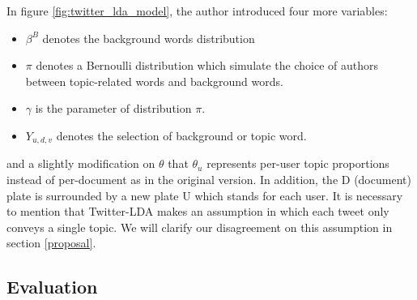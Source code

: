 \documentclass[conference,compsoc]{IEEEtran}
\begin{document}
In figure \ref{fig:twitter_lda_model}, the author introduced four more variables:
\begin{itemize}
	\item $\beta^B$ denotes the background words distribution
	\item $\pi$ denotes a Bernoulli distribution which simulate the choice of authors between topic-related words and background words.
	\item $\gamma$ is the parameter of distribution $\pi$.
	\item $Y_{u,d,v}$ denotes the selection of background or topic word.
\end{itemize} 
and a slightly modification on $\theta$ that $\theta_u$ represents per-user topic proportions instead of per-document as in the original version. In addition, the D (document) plate is surrounded by a new plate U which stands for each user. It is necessary to mention that Twitter-LDA makes an assumption in which each tweet only conveys a single topic. We will clarify our disagreement on this assumption in section \ref{proposal}.


\subsection{Evaluation} \label{evaluation}
\end{document}
